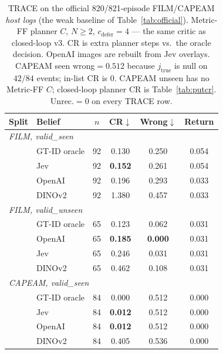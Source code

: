 \begin{table}[t]
\centering
\caption{TRACE on the official 820/821-episode FILM/CAPEAM \emph{host logs} (the weak baseline of Table~\ref{tab:official}).
Metric-FF planner $C$, $N\ge 2$, $c_{\mathrm{defer}}{=}4$ --- the same critic as closed-loop v3.
CR is extra planner steps vs.\ the oracle decision.
OpenAI images are rebuilt from Jev overlays.
CAPEAM seen wrong${=}0.512$ because $j_{\mathrm{true}}$ is null on $42/84$ events; in-list CR is $0$.
CAPEAM unseen has no Metric-FF $C$; closed-loop planner CR is Table~\ref{tab:putcr}.
Unrec.${=}0$ on every TRACE row.}
\label{tab:replay}
\scriptsize
\setlength{\tabcolsep}{3pt}
\begin{tabular}{llcccc}
\toprule
Split & Belief & $n$ & CR$\downarrow$ & Wrong$\downarrow$ & Return \\
\midrule
\multicolumn{6}{l}{\textit{FILM, valid\_seen}}\\
& GT-ID oracle & 92 & 0.130 & 0.250 & 0.054 \\
& Jev & 92 & \textbf{0.152} & 0.261 & 0.054 \\
& OpenAI & 92 & 0.196 & 0.293 & 0.033 \\
& DINOv2 & 92 & 1.380 & 0.457 & 0.033 \\
\midrule
\multicolumn{6}{l}{\textit{FILM, valid\_unseen}}\\
& GT-ID oracle & 65 & 0.123 & 0.062 & 0.031 \\
& OpenAI & 65 & \textbf{0.185} & \textbf{0.000} & 0.031 \\
& Jev & 65 & 0.246 & 0.031 & 0.031 \\
& DINOv2 & 65 & 0.462 & 0.108 & 0.031 \\
\midrule
\multicolumn{6}{l}{\textit{CAPEAM, valid\_seen}}\\
& GT-ID oracle & 84 & 0.000 & 0.512 & 0.000 \\
& Jev & 84 & \textbf{0.012} & 0.512 & 0.000 \\
& OpenAI & 84 & \textbf{0.012} & 0.512 & 0.000 \\
& DINOv2 & 84 & 0.405 & 0.536 & 0.000 \\
\bottomrule
\end{tabular}
\end{table}
